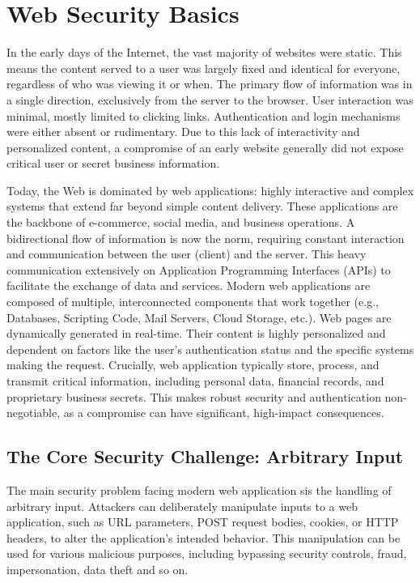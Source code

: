 \section{Web Security Basics}
In the early days of the Internet, the vast majority of websites were static. This means the content served to a user was largely fixed and identical for everyone, regardless of who was viewing it or when. The primary flow of information was in a single direction, exclusively from the server to the browser. User interaction was minimal, mostly limited to clicking links. Authentication and login mechanisms were either absent or rudimentary. Due to this lack of interactivity and personalized content, a compromise of an early website generally did not expose critical user or secret business information.

Today, the Web is dominated by web applications: highly interactive and complex systems that extend far beyond simple content delivery. These applications are the backbone of e-commerce, social media, and business operations. A bidirectional flow of information is now the norm, requiring constant interaction and communication between the user (client) and the server. This heavy communication extensively on Application Programming Interfaces (APIs) to facilitate the exchange of data and services. Modern web applications are composed of multiple, interconnected components that work together (e.g., Databases, Scripting Code, Mail Servers, Cloud Storage, etc.). Web pages are dynamically generated in real-time. Their content is highly personalized and dependent on factors like the user's authentication status and the specific systems making the request. Crucially, web application typically store, process, and transmit critical information, including personal data, financial records, and proprietary business secrets. This makes robust security and authentication non-negotiable, as a compromise can have significant, high-impact consequences.

\subsection{The Core Security Challenge: Arbitrary Input}
The main security problem facing modern web application sis the handling of arbitrary input. Attackers can deliberately manipulate inputs to a web application, such as URL parameters, POST request bodies, cookies, or HTTP headers, to alter the application's intended behavior. This manipulation can be used for various malicious purposes, including bypassing security controls, fraud, impersonation, data theft and so on.

